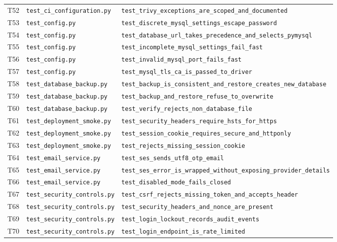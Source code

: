 {\begin{longtable}{P{.8cm}P{4cm}P{8cm}}
T52 & \nolinkurl{test_ci_configuration.py} & \nolinkurl{test_trivy_exceptions_are_scoped_and_documented} \\
T53 & \nolinkurl{test_config.py} & \nolinkurl{test_discrete_mysql_settings_escape_password} \\
T54 & \nolinkurl{test_config.py} & \nolinkurl{test_database_url_takes_precedence_and_selects_pymysql} \\
T55 & \nolinkurl{test_config.py} & \nolinkurl{test_incomplete_mysql_settings_fail_fast} \\
T56 & \nolinkurl{test_config.py} & \nolinkurl{test_invalid_mysql_port_fails_fast} \\
T57 & \nolinkurl{test_config.py} & \nolinkurl{test_mysql_tls_ca_is_passed_to_driver} \\
T58 & \nolinkurl{test_database_backup.py} & \nolinkurl{test_backup_is_consistent_and_restore_creates_new_database} \\
T59 & \nolinkurl{test_database_backup.py} & \nolinkurl{test_backup_and_restore_refuse_to_overwrite} \\
T60 & \nolinkurl{test_database_backup.py} & \nolinkurl{test_verify_rejects_non_database_file} \\
T61 & \nolinkurl{test_deployment_smoke.py} & \nolinkurl{test_security_headers_require_hsts_for_https} \\
T62 & \nolinkurl{test_deployment_smoke.py} & \nolinkurl{test_session_cookie_requires_secure_and_httponly} \\
T63 & \nolinkurl{test_deployment_smoke.py} & \nolinkurl{test_rejects_missing_session_cookie} \\
T64 & \nolinkurl{test_email_service.py} & \nolinkurl{test_ses_sends_utf8_otp_email} \\
T65 & \nolinkurl{test_email_service.py} & \nolinkurl{test_ses_error_is_wrapped_without_exposing_provider_details} \\
T66 & \nolinkurl{test_email_service.py} & \nolinkurl{test_disabled_mode_fails_closed} \\
T67 & \nolinkurl{test_security_controls.py} & \nolinkurl{test_csrf_rejects_missing_token_and_accepts_header} \\
T68 & \nolinkurl{test_security_controls.py} & \nolinkurl{test_security_headers_and_nonce_are_present} \\
T69 & \nolinkurl{test_security_controls.py} & \nolinkurl{test_login_lockout_records_audit_events} \\
T70 & \nolinkurl{test_security_controls.py} & \nolinkurl{test_login_endpoint_is_rate_limited} \\

\end{longtable}}
